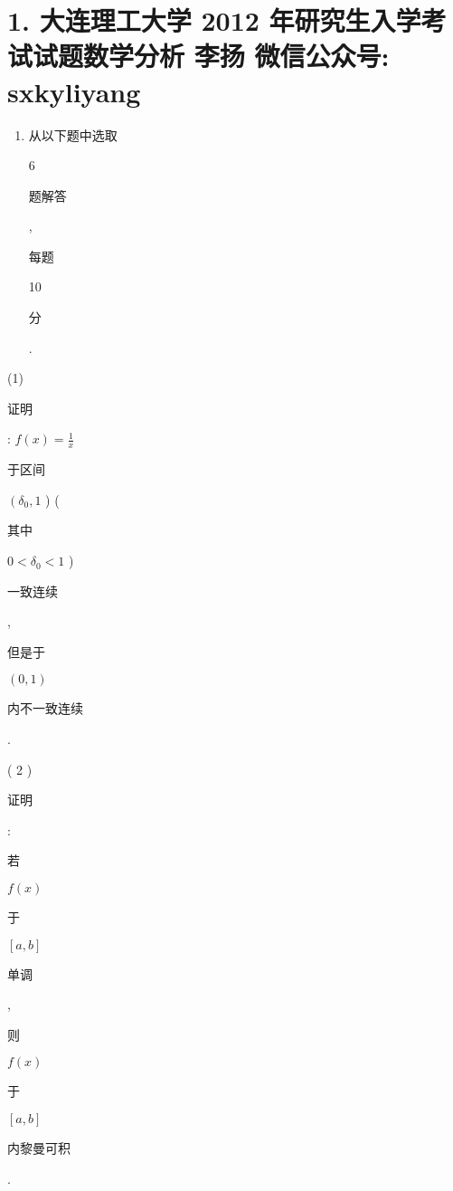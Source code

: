 \documentclass[10pt]{article}
\begin{document}
\section{1. 大连理工大学 2012 年研究生入学考试试题数学分析 
 李扬 
 微信公众号: sxkyliyang}
\begin{enumerate}
  \item \begin{CJK}{UTF8}{mj}从以下题中选取\end{CJK} 6 \begin{CJK}{UTF8}{mj}题解答\end{CJK}, \begin{CJK}{UTF8}{mj}每题\end{CJK} 10 \begin{CJK}{UTF8}{mj}分\end{CJK}.
\end{enumerate}
(1) \begin{CJK}{UTF8}{mj}证明\end{CJK}: $f(x)=\frac{1}{x}$ \begin{CJK}{UTF8}{mj}于区间\end{CJK} $\left(\delta_{0}, 1\right.$ ) (\begin{CJK}{UTF8}{mj}其中\end{CJK} $0<\delta_{0}<1$ ) \begin{CJK}{UTF8}{mj}一致连续\end{CJK}, \begin{CJK}{UTF8}{mj}但是于\end{CJK} $(0,1)$ \begin{CJK}{UTF8}{mj}内不一致连续\end{CJK}.

( 2 ) \begin{CJK}{UTF8}{mj}证明\end{CJK}: \begin{CJK}{UTF8}{mj}若\end{CJK} $f(x)$ \begin{CJK}{UTF8}{mj}于\end{CJK} $[a, b]$ \begin{CJK}{UTF8}{mj}单调\end{CJK}, \begin{CJK}{UTF8}{mj}则\end{CJK} $f(x)$ \begin{CJK}{UTF8}{mj}于\end{CJK} $[a, b]$ \begin{CJK}{UTF8}{mj}内黎曼可积\end{CJK}.
\end{document}
